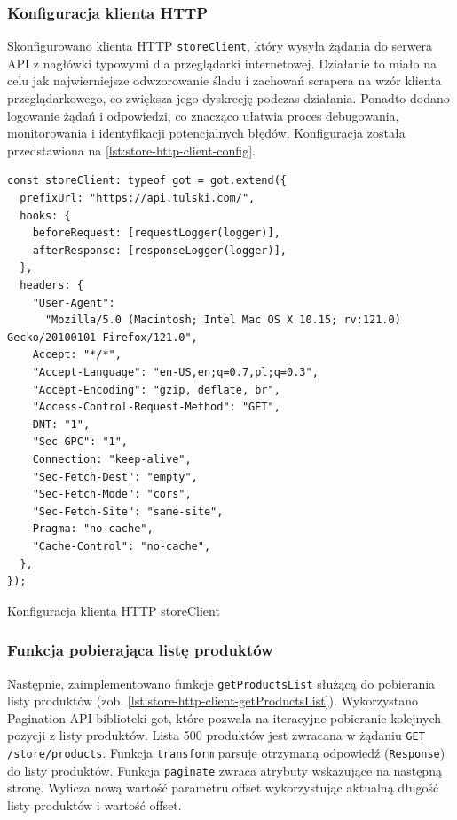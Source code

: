 \subsubsection{Konfiguracja klienta HTTP}

Skonfigurowano klienta HTTP \texttt{storeClient}, który wysyła żądania do serwera API z nagłówki typowymi dla przeglądarki internetowej.
Działanie to miało na celu jak najwierniejsze odwzorowanie śladu i zachowań scrapera na wzór klienta przeglądarkowego, co zwiększa jego dyskrecję podczas działania.
Ponadto dodano logowanie żądań i odpowiedzi, co znacząco ułatwia proces debugowania, monitorowania i identyfikacji potencjalnych błędów.
Konfiguracja została przedstawiona na \autoref{lst:store-http-client-config}.

\begin{listing}[H]
    \begin{verbatim}
const storeClient: typeof got = got.extend({
  prefixUrl: "https://api.tulski.com/",
  hooks: {
    beforeRequest: [requestLogger(logger)],
    afterResponse: [responseLogger(logger)],
  },
  headers: {
    "User-Agent":
      "Mozilla/5.0 (Macintosh; Intel Mac OS X 10.15; rv:121.0) Gecko/20100101 Firefox/121.0",
    Accept: "*/*",
    "Accept-Language": "en-US,en;q=0.7,pl;q=0.3",
    "Accept-Encoding": "gzip, deflate, br",
    "Access-Control-Request-Method": "GET",
    DNT: "1",
    "Sec-GPC": "1",
    Connection: "keep-alive",
    "Sec-Fetch-Dest": "empty",
    "Sec-Fetch-Mode": "cors",
    "Sec-Fetch-Site": "same-site",
    Pragma: "no-cache",
    "Cache-Control": "no-cache",
  },
});
    \end{verbatim}
    \caption{Konfiguracja klienta HTTP storeClient}
    \label{lst:store-http-client-config}
\end{listing}

\subsubsection{Funkcja pobierająca listę produktów}

Następnie, zaimplementowano funkcje \texttt{getProductsList} służącą do pobierania listy produktów (zob. \autoref{lst:store-http-client-getProductsList}).
Wykorzystano Pagination API biblioteki got\cite{got-paginate-docs}, które pozwala na iteracyjne pobieranie kolejnych pozycji z listy produktów.
Lista 500 produktów jest zwracana w żądaniu \texttt{GET /store/products}.
Funkcja \texttt{transform} parsuje otrzymaną odpowiedź (\texttt{Response}) do listy produktów.
Funkcja \texttt{paginate} zwraca atrybuty wskazujące na następną stronę. Wylicza nową wartość parametru offset wykorzystując aktualną długość listy produktów i wartość offset.

